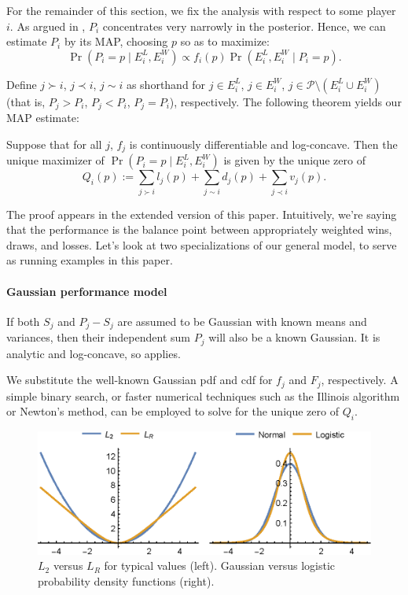 For the remainder of this section, we fix the analysis with respect to some player $i$. As argued in , $P_i$ concentrates very narrowly in the posterior. Hence, we can estimate $P_i$ by its MAP, choosing $p$ so as to maximize:
\[\Pr(P_i=p\mid E^L_i,E^W_i) \propto f_i(p) \Pr(E^L_i,E^W_i\mid P_i=p).\]

Define $j\succ i$, $j\prec i$, $j\sim i$ as shorthand for $j\in E^L_i$, $j\in E^W_i$, $j\in \mathcal P\setminus (E^L_i\cup E^W_i)$ (that is, $P_j>P_i$, $P_j<P_i$, $P_j=P_i$), respectively. The following theorem yields our MAP estimate:
\begin{theorem}
\label{thm:uniq-max}
Suppose that for all $j$, $f_j$ is continuously differentiable and log-concave. Then the unique maximizer of $\Pr(P_i=p\mid E^L_i,E^W_i)$ is given by the unique zero of
\[Q_i(p) := \sum_{j \succ i} l_j(p) + \sum_{j \sim i} d_j(p) + \sum_{j \prec i} v_j(p).\]
\end{theorem}
The proof appears in the extended version of this paper. Intuitively, we're saying that the performance is the balance point between appropriately weighted wins, draws, and losses. Let's look at two specializations of our general model, to serve as running examples in this paper.

\paragraph{Gaussian performance model}
If both $S_j$ and $P_j-S_j$ are assumed to be Gaussian with known means and variances, then their independent sum $P_j$ will also be a known Gaussian. It is analytic and log-concave, so  applies.

We substitute the well-known Gaussian pdf and cdf for $f_j$ and $F_j$, respectively. A simple binary search, or faster numerical techniques such as the Illinois algorithm or Newton's method, can be employed to solve for the unique zero of $Q_i$.

\begin{figure}
    \centering
    \includegraphics[width=1.05\columnwidth]{images/l2-lr-plot.eps}
    \caption{$L_2$ versus $L_R$ for typical values (left). Gaussian versus logistic probability density functions (right).}
    \label{fig:l2-lr-plot}
\end{figure}

